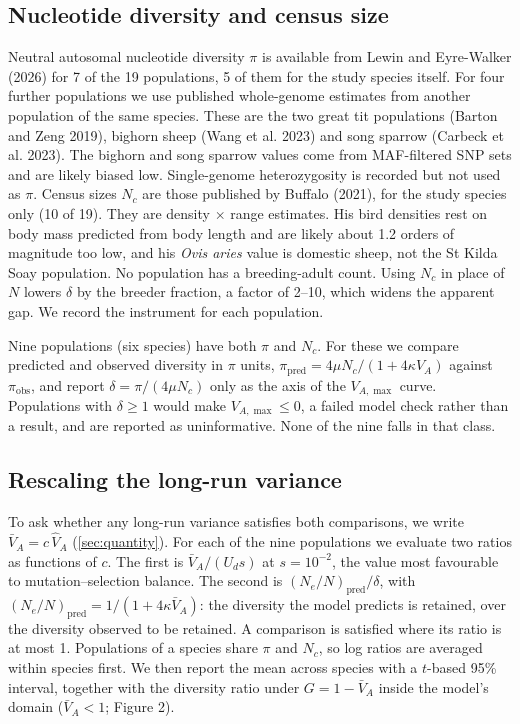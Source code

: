 \documentclass[12pt]{article}
\begin{document}
\subsection{Nucleotide diversity and census size}
Neutral autosomal nucleotide diversity $\pi$ is available from Lewin and Eyre-Walker (2026) for 7 of the 19 populations, 5 of them for the study species itself. For four further populations we use published whole-genome estimates from another population of the same species. These are the two great tit populations (Barton and Zeng 2019), bighorn sheep (Wang et al. 2023) and song sparrow (Carbeck et al. 2023). The bighorn and song sparrow values come from MAF-filtered SNP sets and are likely biased low. Single-genome heterozygosity is recorded but not used as $\pi$. Census sizes $N_c$ are those published by Buffalo (2021), for the study species only (10 of 19). They are density $\times$ range estimates. His bird densities rest on body mass predicted from body length and are likely about 1.2 orders of magnitude too low, and his \emph{Ovis aries} value is domestic sheep, not the St Kilda Soay population. No population has a breeding-adult count. Using $N_c$ in place of $N$ lowers $\delta$ by the breeder fraction, a factor of 2--10, which widens the apparent gap. We record the instrument for each population.

Nine populations (six species) have both $\pi$ and $N_c$. For these we compare predicted and observed diversity in $\pi$ units, $\pi_\text{pred} = 4\mu N_c/(1 + 4\kappa V_A)$ against $\pi_\text{obs}$, and report $\delta = \pi/(4\mu N_c)$ only as the axis of the $V_{A,\max}$ curve. Populations with $\delta \ge 1$ would make $V_{A,\max} \le 0$, a failed model check rather than a result, and are reported as uninformative. None of the nine falls in that class.

\subsection{Rescaling the long-run variance}
To ask whether any long-run variance satisfies both comparisons, we write $\bar{V}_A = c\,\hat{V}_A$ (\autoref{sec:quantity}). For each of the nine populations we evaluate two ratios as functions of $c$. The first is $\bar{V}_A/(U_d s)$ at $s = 10^{-2}$, the value most favourable to mutation--selection balance. The second is $(N_e/N)_\text{pred}/\delta$, with $(N_e/N)_\text{pred} = 1/(1 + 4\kappa\bar{V}_A)$: the diversity the model predicts is retained, over the diversity observed to be retained. A comparison is satisfied where its ratio is at most 1. Populations of a species share $\pi$ and $N_c$, so log ratios are averaged within species first. We then report the mean across species with a $t$-based 95\% interval, together with the diversity ratio under $G = 1 - \bar{V}_A$ inside the model's domain ($\bar{V}_A < 1$; Figure 2).
\end{document}
